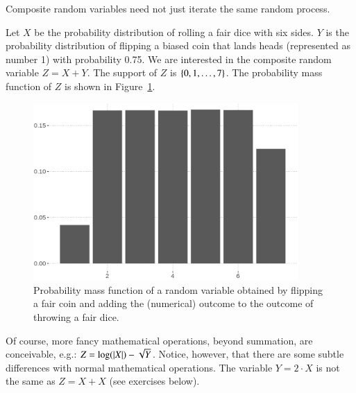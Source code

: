 \documentclass[nobib,nofonts]{tufte-handout}
\newcommand{\mult}{\ensuremath{\cdot}}
\begin{document}

Composite random variables need not just iterate the same random process.
\begin{example}
  Let $X$ be the probability distribution of rolling a fair dice with six sides.
  $Y$ is the probability distribution of flipping a biased coin that lands heads (represented as number 1) with probability 0.75.
  We are interested in the composite random variable $Z = X + Y$.
  The support of $Z$ is $\left\{0, 1, \dots, 7\right\}$.
  The probability mass function of $Z$ is shown in Figure~\ref{fig:composite-RV}.
  \begin{figure}
    \centering
    \includegraphics[width=0.9\textwidth]{00-pics/05-04-mass-composite-RV.png}
    \caption{Probability mass function of a random variable obtained by flipping a fair coin and adding the (numerical) outcome to the outcome of throwing a fair dice.}
    \label{fig:composite-RV}
  \end{figure}
\end{example}

Of course, more fancy mathematical operations, beyond summation, are conceivable, e.g.: $Z = \log(\lvert X \rvert) - \sqrt{Y}$.
Notice, however, that there are some subtle differences with normal mathematical operations.
The variable $Y = 2 \mult X$ is not the same as $Z = X + X$ (see exercises below).
\end{document}
